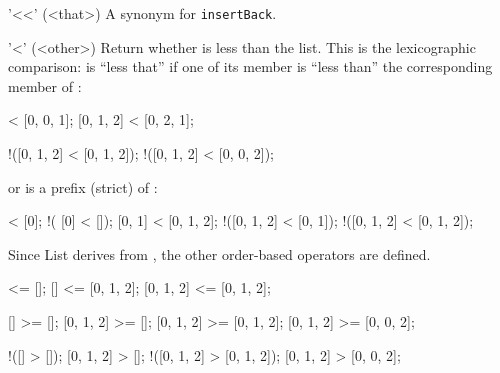 \begin{urbiscriptapi}
\item['<<'](<that>)%
  A synonym for \lstinline|insertBack|.

\item['<'](<other>)%
  Return whether \this is less than the  list.  This is the
  lexicographic comparison: \this is ``less that'' if one of its member is
  ``less than'' the corresponding member of :

\begin{urbiassert}
  [0, 0, 0] < [0, 0, 1];
  [0, 1, 2] < [0, 2, 1];

!([0, 1, 2] < [0, 1, 2]);
!([0, 1, 2] < [0, 0, 2]);
\end{urbiassert}

  \noindent
  or  is a prefix (strict) of \this:

\begin{urbiassert}
           [] < [0];          !(      [0] < []);
       [0, 1] < [0, 1, 2];    !([0, 1, 2] < [0, 1]);
  !([0, 1, 2] < [0, 1, 2]);
\end{urbiassert}

  Since List derives from , the other order-based
  operators are defined.

\begin{urbiassert}
        [] <= [];
        [] <= [0, 1, 2];
 [0, 1, 2] <= [0, 1, 2];

        [] >= [];
 [0, 1, 2] >= [];
 [0, 1, 2] >= [0, 1, 2];
 [0, 1, 2] >= [0, 0, 2];

       !([] > []);
  [0, 1, 2] > [];
!([0, 1, 2] > [0, 1, 2]);
  [0, 1, 2] > [0, 0, 2];
\end{urbiassert}
\end{urbiscriptapi}

